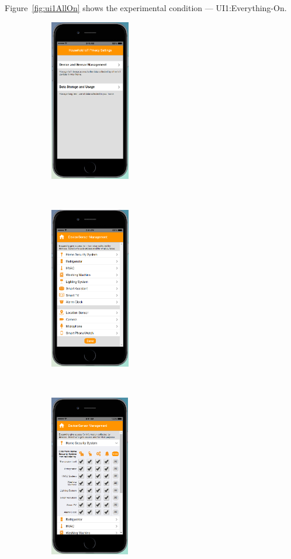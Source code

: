 Figure~\ref{fig:ui1AllOn} shows the experimental condition --- UI1:Everything-On.
\begin{figure}
	\centering
	\begin{subfigure}[t]{0.24\textwidth}
		\centering
		\includegraphics[height=2.8in]{figures/ui1allOff1.png}
	\end{subfigure}%
	~
	\begin{subfigure}[t]{0.24\textwidth}
		\centering
		\includegraphics[height=2.8in]{figures/ui1allOff2.png}
	\end{subfigure}%
	~
	\begin{subfigure}[t]{0.24\textwidth}
		\centering
		\includegraphics[height=2.8in]{figures/ui2allOn3.png}

\end{subfigure}
\end{figure}
